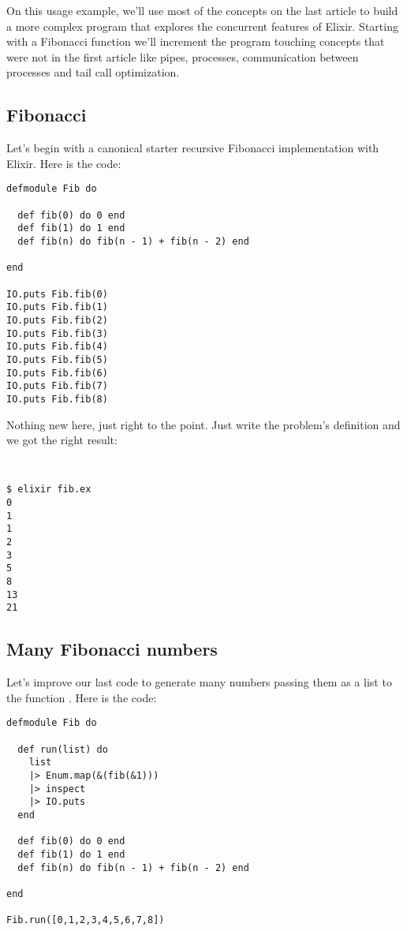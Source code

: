 On this usage example, we'll use most of the concepts on the last article to 
build a more complex program that explores the concurrent features of Elixir.
Starting with a Fibonacci function we'll increment the program touching concepts
that were not in the first article like pipes, processes, communication between 
processes and tail call optimization.

\subsection{Fibonacci}

Let's begin with a canonical starter recursive Fibonacci implementation with 
Elixir. Here is the code:

\begin{lstlisting}[label=efib1,caption=Classic Fibonacci]
defmodule Fib do

  def fib(0) do 0 end
  def fib(1) do 1 end
  def fib(n) do fib(n - 1) + fib(n - 2) end

end

IO.puts Fib.fib(0)
IO.puts Fib.fib(1)
IO.puts Fib.fib(2)
IO.puts Fib.fib(3)
IO.puts Fib.fib(4)
IO.puts Fib.fib(5)
IO.puts Fib.fib(6)
IO.puts Fib.fib(7)
IO.puts Fib.fib(8)
\end{lstlisting}

Nothing new here, just right to the point. Just write the problem's definition 
and we got the right result:

\begin{verbatim}
  
\end{verbatim}

\begin{verbatim}
$ elixir fib.ex 
0
1
1
2
3
5
8
13
21
\end{verbatim}

\subsection{Many Fibonacci numbers}

Let's improve our last code to generate many numbers passing them as a list to 
the function \cite{6_2}. Here is the code:

\begin{lstlisting}[label=emf,caption=Many Fibonacci numbers]
defmodule Fib do

  def run(list) do
    list
    |> Enum.map(&(fib(&1)))
    |> inspect
    |> IO.puts
  end

  def fib(0) do 0 end
  def fib(1) do 1 end
  def fib(n) do fib(n - 1) + fib(n - 2) end

end

Fib.run([0,1,2,3,4,5,6,7,8])
\end{lstlisting}

